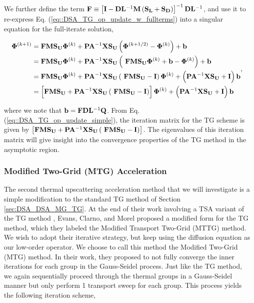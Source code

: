 \noindent We further define the term ${\bf F} \equiv \left[ {\bf I} - {\bf D}{\bf L}^{-1} {\bf M} \left(  {\bf S_L} + {\bf S_D} \right) \right]^{-1} {\bf D}{\bf L}^{-1}$, and use it to re-express Eq. (\ref{eq::DSA_TG_op_update_w_fullterms}) into a singular equation for the full-iterate solution,

\begin{equation}
\label{eq::DSA_TG_op_update_simple}
\begin{aligned}
 {\bf \Phi}^{(k+1)} &=  {\bf F}  {\bf M} {\bf S_U} {\bf \Phi}^{(k)} +  {\bf P} {\bf A}^{-1}  {\bf X} {\bf S_{U}} \left(  {\bf \Phi}^{(k+1/2)} - {\bf \Phi}^{(k)}  \right) + {\bf b} \\
&= {\bf F}  {\bf M} {\bf S_U} {\bf \Phi}^{(k)} +  {\bf P} {\bf A}^{-1}  {\bf X} {\bf S_{U}} \left(  \ {\bf F}  {\bf M} {\bf S_U} {\bf \Phi}^{(k)} + {\bf b} - {\bf \Phi}^{(k)}  \right) + {\bf b} \\
&= {\bf F}  {\bf M} {\bf S_U} {\bf \Phi}^{(k)} +  {\bf P} {\bf A}^{-1}  {\bf X} {\bf S_{U}} \left(  \ {\bf F}  {\bf M} {\bf S_U}  -  {\bf I} \right){\bf \Phi}^{(k)} + \left(  {\bf P} {\bf A}^{-1}  {\bf X} {\bf S_{U}}  + {\bf I} \right) {\bf b} \\
&= \left[ {\bf F}  {\bf M} {\bf S_U} +  {\bf P} {\bf A}^{-1}  {\bf X} {\bf S_{U}} \left(  \ {\bf F}  {\bf M} {\bf S_U}  -  {\bf I} \right) \right] {\bf \Phi}^{(k)} + \left(  {\bf P} {\bf A}^{-1}  {\bf X} {\bf S_{U}}  + {\bf I} \right) {\bf b}
\end{aligned} ,
\end{equation}

\noindent where we note that ${\bf b}={\bf F} {\bf D}{\bf L}^{-1}  {\bf Q}$. From Eq. (\ref{eq::DSA_TG_op_update_simple}), the iteration matrix for the TG scheme is given by $\left[ {\bf F}  {\bf M} {\bf S_U} +  {\bf P} {\bf A}^{-1}  {\bf X} {\bf S_{U}} \left(  \ {\bf F}  {\bf M} {\bf S_U}  -  {\bf I} \right) \right]$. The eigenvalues of this iteration matrix will give insight into the convergence properties of the TG method in the asymptotic region.


\subsubsection{Modified Two-Grid (MTG) Acceleration}
\label{sec:DSA_DSA_MG_MTG}

The second thermal upscattering acceleration method that we will investigate is a simple modification to the standard TG method of Section \ref{sec:DSA_DSA_MG_TG}. At the end of their work involving a TSA variant of the TG method \cite{evans2010transport}, Evans, Clarno, and Morel proposed a modified form for the TG method, which they labeled the Modified Transport Two-Grid (MTTG) method. We wish to adopt their iterative strategy, but keep using the diffusion equation as our low-order operator. We choose to call this method the Modified Two-Grid (MTG) method. In their work, they proposed to not fully converge the inner iterations for each group in the Gauss-Seidel process. Just like the TG method, we again sequentially proceed through the thermal groups in a Gauss-Seidel manner but only perform 1 transport sweep for each group. This process yields the following iteration scheme,

